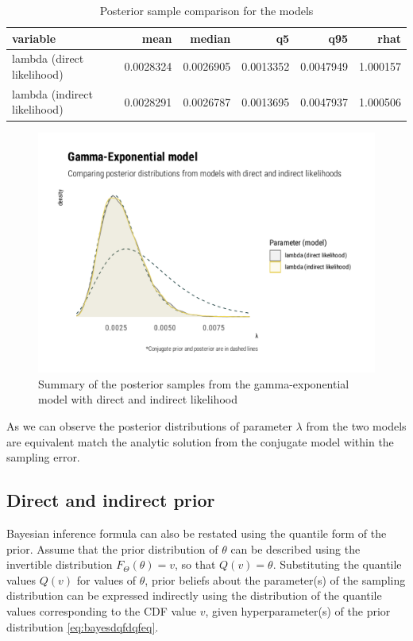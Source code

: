 \documentclass[
  12pt,
]{article}
\begin{document}
\begin{table}[!h]

\caption{\label{tab:gexp-likelihood-tab}Posterior sample comparison for the models}
\centering
\begin{tabular}[t]{lrrrrr}
\toprule
variable & mean & median & q5 & q95 & rhat\\
\midrule
lambda (direct likelihood) & 0.0028324 & 0.0026905 & 0.0013352 & 0.0047949 & 1.000157\\
lambda (indirect likelihood) & 0.0028291 & 0.0026787 & 0.0013695 & 0.0047937 & 1.000506\\
\bottomrule
\end{tabular}
\end{table}

\begin{figure}

{\centering \includegraphics[width=0.5\linewidth]{ilbm_article_files/figure-latex/gexp-likelihood-graphs-1} 

}

\caption{Summary of the posterior samples from the gamma-exponential model with direct and indirect likelihood}\label{fig:gexp-likelihood-graphs}
\end{figure}

As we can observe the posterior distributions of parameter \(\lambda\) from the two models are equivalent match the analytic solution from the conjugate model within the sampling error.

\hypertarget{direct-and-indirect-prior}{%
\subsection{Direct and indirect prior}\label{direct-and-indirect-prior}}

Bayesian inference formula can also be restated using the quantile form of the prior. Assume that the prior distribution of \(\theta\) can be described using the invertible distribution \(F_\Theta(\theta)=v\), so that \(Q(v)=\theta\). Substituting the quantile values \(Q(v)\) for values of \(\theta\), prior beliefs about the parameter(s) of the sampling distribution can be expressed indirectly using the distribution of the quantile values corresponding to the CDF value \(v\), given hyperparameter(s) of the prior distribution \eqref{eq:bayesdqfdqfeq}.
\end{document}
